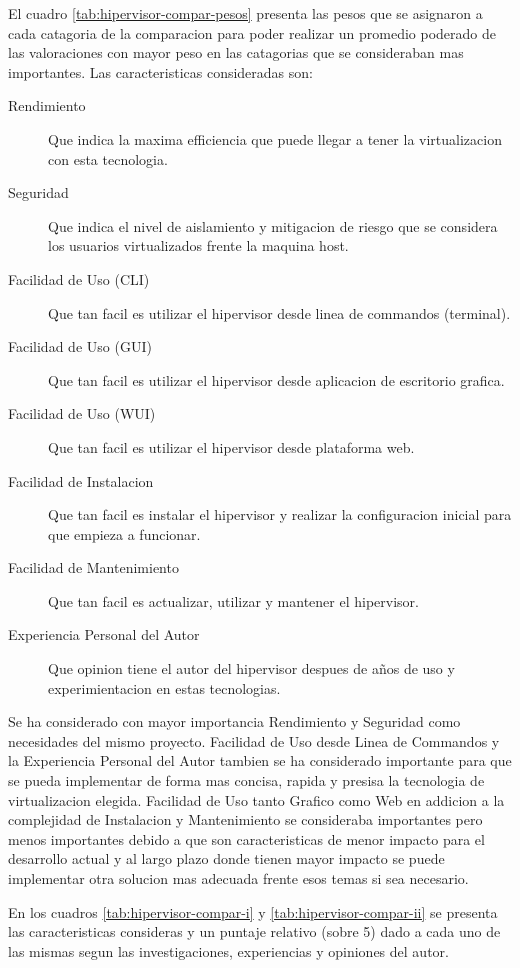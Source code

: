 El cuadro \ref{tab:hipervisor-compar-pesos} presenta las pesos que se asignaron a cada catagoria de la comparacion para poder realizar un promedio poderado de las valoraciones con mayor peso en las catagorias que se consideraban mas importantes. Las caracteristicas consideradas son:
\begin{description}
	\item[Rendimiento] Que indica la maxima efficiencia que puede llegar a tener la virtualizacion con esta tecnologia.
    \item[Seguridad] Que indica el nivel de aislamiento y mitigacion de riesgo que se considera los usuarios virtualizados frente la maquina host.
    \item[Facilidad de Uso (CLI)] Que tan facil es utilizar el hipervisor desde linea de commandos (terminal).
    \item[Facilidad de Uso (GUI)] Que tan facil es utilizar el hipervisor desde aplicacion de escritorio grafica.
    \item[Facilidad de Uso (WUI)] Que tan facil es utilizar el hipervisor desde plataforma web.
    \item[Facilidad de Instalacion] Que tan facil es instalar el hipervisor y realizar la configuracion inicial para que empieza a funcionar.
    \item[Facilidad de Mantenimiento] Que tan facil es actualizar, utilizar y mantener el hipervisor.
    \item[Experiencia Personal del Autor] Que opinion tiene el autor del hipervisor despues de años de uso y experimientacion en estas tecnologias.
\end{description}
Se ha considerado con mayor importancia Rendimiento y Seguridad como necesidades del mismo proyecto. Facilidad de Uso desde Linea de Commandos y la Experiencia Personal del Autor tambien se ha considerado importante para que se pueda implementar de forma mas concisa, rapida y presisa la tecnologia de virtualizacion elegida. Facilidad de Uso tanto Grafico como Web en addicion a la complejidad de Instalacion y Mantenimiento se consideraba importantes pero menos importantes debido a que son caracteristicas de menor impacto para el desarrollo actual y al largo plazo donde tienen mayor impacto se puede implementar otra solucion mas adecuada frente esos temas si sea necesario. 

En los cuadros \ref{tab:hipervisor-compar-i} y \ref{tab:hipervisor-compar-ii} se presenta las caracteristicas consideras y un puntaje relativo (sobre 5) dado a cada uno de las mismas segun las investigaciones, experiencias y opiniones del autor.

